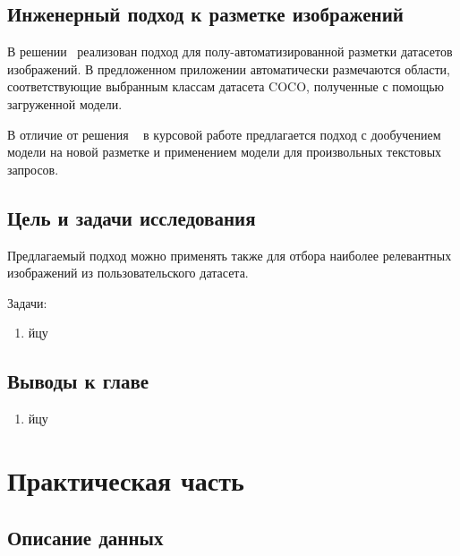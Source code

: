 \documentclass[a4paper,14pt]{article}
\begin{document}

    \subsection{Инженерный подход к разметке изображений}

    В решении~\cite{AnnoMage} реализован подход для полу-автоматизированной разметки датасетов изображений. 
    В предложенном приложении автоматически размечаются области, соответствующие выбранным классам датасета COCO, полученные с помощью загруженной модели.

    В отличие от решения ~\cite{AnnoMage} в курсовой работе предлагается подход с дообучением модели на новой разметке и применением модели для произвольных текстовых запросов.

    \subsection{Цель и задачи исследования}
    
    Предлагаемый подход можно применять также для отбора наиболее релевантных изображений из пользовательского датасета.

    Задачи:
    \begin{enumerate}
        [1)]
        \itemsep0em
        \item йцу

    \end{enumerate}

    \subsection{Выводы к главе \thesection}
    \begin{enumerate}
        [1)]
        \itemsep0em
        \item йцу
    \end{enumerate}

    \newpage


    \section{Практическая часть}
    
	\subsection{Описание данных}    
    
\end{document}
